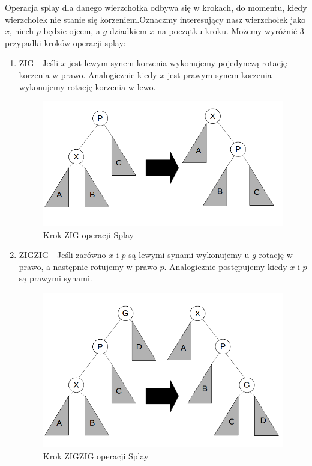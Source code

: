 \documentclass[declaration,shortabstract]{iithesis}
\theoremstyle{thm}
\theoremstyle{remark}
\theoremstyle{plain}
\theoremstyle{plain}
\theoremstyle{plain}
\begin{document}
Operacja splay dla danego wierzchołka odbywa się w krokach, do momentu, kiedy wierzchołek nie stanie się korzeniem.Oznaczmy interesujący nasz wierzchołek jako $x$, niech $p$ będzie ojcem, a $g$ dziadkiem $x$ na początku kroku. Możemy wyróżnić 3 przypadki kroków operacji splay: 
\begin{enumerate}  

\item{ZIG - Jeśli $x$ jest lewym synem korzenia wykonujemy pojedynczą rotację korzenia w prawo. Analogicznie kiedy $x$ jest prawym synem korzenia wykonujemy rotację korzenia w lewo.\\  
\begin{figure}[H]
\centering
\includegraphics[scale = 0.3]{zig.png}  
\caption{Krok ZIG operacji Splay}  
\label{fig:zig} 
\end{figure}}   

\item{ZIGZIG - Jeśli zarówno $x$ i $p$ są lewymi synami wykonujemy u $g$ rotację w prawo, a następnie rotujemy w prawo $p$. Analogicznie postępujemy kiedy $x$ i $p$ są prawymi synami.\\  

\begin{figure}[H]  
\centering
    \includegraphics[scale = 0.3]{zigzig.png}
      \caption{Krok ZIGZIG operacji Splay}  
      \label{fig:zigzig} 
      \end{figure}}  


\end{enumerate}
\end{document}
